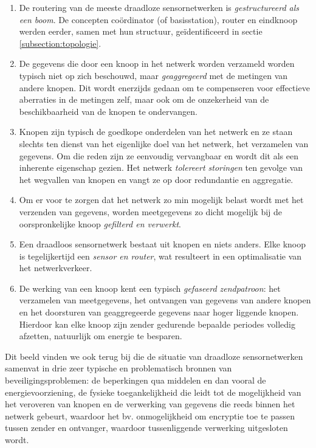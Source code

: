 \begin{enumerate}

\item{De routering van de meeste draadloze sensornetwerken is
\emph{gestructureerd als een boom}. De concepten co\"ordinator (of
basisstation), router en eindknoop werden eerder, samen met hun structuur,
ge\"identificeerd in sectie \ref{subsection:topologie}.}

\item{De gegevens die door een knoop in het netwerk worden verzameld worden
typisch niet op zich beschouwd, maar \emph{geaggregeerd} met de metingen van
andere knopen. Dit wordt enerzijds gedaan om te compenseren voor effectieve
aberraties in de metingen zelf, maar ook om de onzekerheid van de
beschikbaarheid van de knopen te ondervangen.}

\item{Knopen zijn typisch de goedkope onderdelen van het netwerk en ze staan
slechts ten dienst van het eigenlijke doel van het netwerk, het verzamelen van
gegevens. Om die reden zijn ze eenvoudig vervangbaar en wordt dit als een
inherente eigenschap gezien. Het netwerk \emph{tolereert storingen} ten gevolge
van het wegvallen van knopen en vangt ze op door redundantie en aggregatie.}

\item{Om er voor te zorgen dat het netwerk zo min mogelijk belast wordt met het
verzenden van gegevens, worden meetgegevens zo dicht mogelijk bij de
oorspronkelijke knoop \emph{gefilterd en verwerkt}.}

\item{Een draadloos sensornetwerk bestaat uit knopen en niets anders. Elke
knoop is tegelijkertijd een \emph{sensor en router}, wat resulteert in een
optimalisatie van het netwerkverkeer.}

\item{De werking van een knoop kent een typisch \emph{gefaseerd zendpatroon}:
het verzamelen van meetgegevens, het ontvangen van gegevens van andere knopen en
het doorsturen van geaggregeerde gegevens naar hoger liggende knopen. Hierdoor
kan elke knoop zijn zender gedurende bepaalde periodes volledig afzetten,
natuurlijk om energie te besparen.}

\end{enumerate}

Dit beeld vinden we ook terug bij \cite{aschenbruck2012security} die de
situatie van draadloze sensornetwerken samenvat in drie zeer typische en
problematisch bronnen van beveiligingsproblemen: de beperkingen qua middelen en
dan vooral de energievoorziening, de fysieke toegankelijkheid die leidt tot de
mogelijkheid van het veroveren van knopen en de verwerking van gegevens die
reeds binnen het netwerk gebeurt, waardoor het bv. onmogelijkheid om encryptie
toe te passen tussen zender en ontvanger, waardoor tussenliggende verwerking
uitgesloten wordt.

